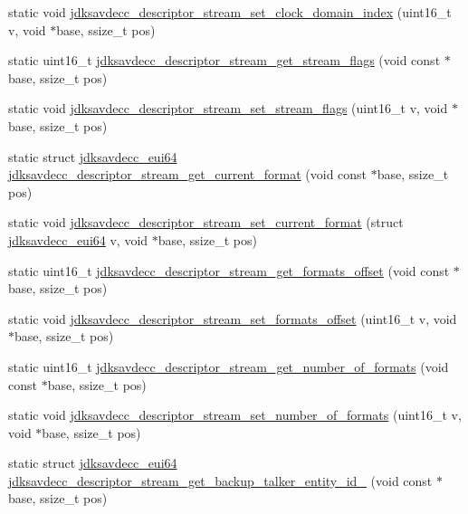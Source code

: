 \begin{DoxyCompactItemize}
\item 
static void \hyperlink{group__descriptor__stream_gabeafb7a311be79625c500a535220ccc2}{jdksavdecc\+\_\+descriptor\+\_\+stream\+\_\+set\+\_\+clock\+\_\+domain\+\_\+index} (uint16\+\_\+t v, void $\ast$base, ssize\+\_\+t pos)
\item 
static uint16\+\_\+t \hyperlink{group__descriptor__stream_gadf24dddf6aa85617cc44caf19a7df7c4}{jdksavdecc\+\_\+descriptor\+\_\+stream\+\_\+get\+\_\+stream\+\_\+flags} (void const $\ast$base, ssize\+\_\+t pos)
\item 
static void \hyperlink{group__descriptor__stream_ga0752cfc3c3e9c2defcd83188ec7fd667}{jdksavdecc\+\_\+descriptor\+\_\+stream\+\_\+set\+\_\+stream\+\_\+flags} (uint16\+\_\+t v, void $\ast$base, ssize\+\_\+t pos)
\item 
static struct \hyperlink{structjdksavdecc__eui64}{jdksavdecc\+\_\+eui64} \hyperlink{group__descriptor__stream_gab1dc69003050a52b74fa7cd9635e0528}{jdksavdecc\+\_\+descriptor\+\_\+stream\+\_\+get\+\_\+current\+\_\+format} (void const $\ast$base, ssize\+\_\+t pos)
\item 
static void \hyperlink{group__descriptor__stream_ga548deb717063430826d2498e6329e06f}{jdksavdecc\+\_\+descriptor\+\_\+stream\+\_\+set\+\_\+current\+\_\+format} (struct \hyperlink{structjdksavdecc__eui64}{jdksavdecc\+\_\+eui64} v, void $\ast$base, ssize\+\_\+t pos)
\item 
static uint16\+\_\+t \hyperlink{group__descriptor__stream_ga20a99e3ab9e02e92655a28e2ce5661c1}{jdksavdecc\+\_\+descriptor\+\_\+stream\+\_\+get\+\_\+formats\+\_\+offset} (void const $\ast$base, ssize\+\_\+t pos)
\item 
static void \hyperlink{group__descriptor__stream_gaaaa49480b22af710f7ac55f2f6606498}{jdksavdecc\+\_\+descriptor\+\_\+stream\+\_\+set\+\_\+formats\+\_\+offset} (uint16\+\_\+t v, void $\ast$base, ssize\+\_\+t pos)
\item 
static uint16\+\_\+t \hyperlink{group__descriptor__stream_gaeb76e60867af744978aafba4150e1f83}{jdksavdecc\+\_\+descriptor\+\_\+stream\+\_\+get\+\_\+number\+\_\+of\+\_\+formats} (void const $\ast$base, ssize\+\_\+t pos)
\item 
static void \hyperlink{group__descriptor__stream_gadb9f7058fad2be3ddcc10cad56fa8c4a}{jdksavdecc\+\_\+descriptor\+\_\+stream\+\_\+set\+\_\+number\+\_\+of\+\_\+formats} (uint16\+\_\+t v, void $\ast$base, ssize\+\_\+t pos)
\item 
static struct \hyperlink{structjdksavdecc__eui64}{jdksavdecc\+\_\+eui64} \hyperlink{group__descriptor__stream_gabd7d75877fef327e19ce52f15ca69bf5}{jdksavdecc\+\_\+descriptor\+\_\+stream\+\_\+get\+\_\+backup\+\_\+talker\+\_\+entity\+\_\+id\+\_} (void const $\ast$base, ssize\+\_\+t pos)

\end{DoxyCompactItemize}
